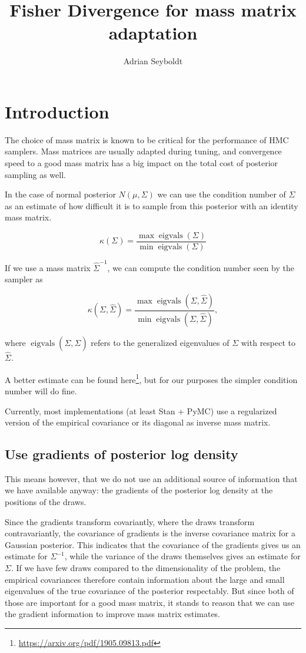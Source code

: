 \documentclass{scrartcl}
\title{Fisher Divergence for mass matrix adaptation}
\author{Adrian Seyboldt}
\DeclareMathOperator{\eigvals}{eigvals}
\begin{document}
\maketitle

\section{Introduction}

The choice of mass matrix is known to be critical for the performance of HMC
samplers. Mass matrices are usually adapted during tuning, and convergence
speed to a good mass matrix has a big impact on the total cost of posterior
sampling as well.

In the case of normal posterior $N(\mu, \Sigma)$ we can use the condition
number of $\Sigma$ as an estimate of how difficult it is to sample from
this posterior with an identity mass matrix.

\[
\kappa(\Sigma) = \frac{\max{\eigvals(\Sigma)}}{\min{\eigvals(\Sigma)}}
\]

If we use a mass matrix $\hat{\Sigma}^{-1}$, we can compute the
condition number seen by the sampler as

\[
\kappa(\Sigma, \hat{\Sigma})
  = \frac{\max{\eigvals(\Sigma, \hat\Sigma)}}{\min{\eigvals(\Sigma, \hat\Sigma)}},
\]

where $\eigvals(\Sigma, \hat\Sigma)$ refers to the generalized eigenvalues of
$\Sigma$ with respect to $\hat\Sigma$.

A better estimate can be found
here\footnote{\url{https://arxiv.org/pdf/1905.09813.pdf}}, but for our purposes
the simpler condition number will do fine.

Currently, most implementations (at least Stan + PyMC) use a regularized
version of the empirical covariance or its diagonal as inverse mass matrix.

\subsection{Use gradients of posterior log density}

This means however, that we do not use an additional source of information that
we have available anyway: the gradients of the posterior log density at the
positions of the draws.

Since the gradients transform covariantly, where the draws transform
contravariantly, the covariance of gradients is the inverse covariance matrix
for a Gaussian posterior. This indicates that the covariance of the gradients
gives us an estimate for $\Sigma^{-1}$, while the variance of the draws
themselves gives an estimate for $\Sigma$. If we have few draws compared to the
dimensionality of the problem, the empirical covariances therefore contain
information about the large and small eigenvalues of the true covariance of the
posterior respectably. But since both of those are important for a good mass
matrix, it stands to reason that we can use the gradient information to improve
mass matrix estimates.
\end{document}
